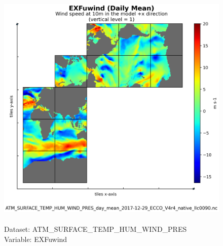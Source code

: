\begin{figure}[H]
\centering
\includegraphics[scale=0.5]{../images/plots/native_plots/Atmosphere_Surface_Temperature_Humidity_Wind_and_Pressure/EXFuwind.png}
\caption{\\Dataset: ATM\_SURFACE\_TEMP\_HUM\_WIND\_PRES\\Variable: EXFuwind}
\label{tab:table-ATM_SURFACE_TEMP_HUM_WIND_PRES_EXFuwind-Plot}
\end{figure}
\pagebreak
